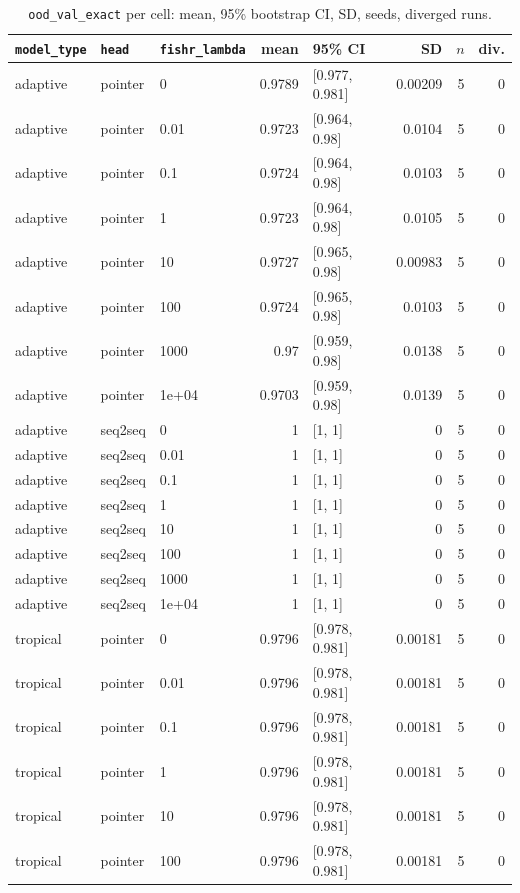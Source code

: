 \documentclass[10pt]{article}
\begin{document}
{\small
\begin{longtable}{lllrlrrr}
\caption{\texttt{ood\_val\_exact} per cell: mean, 95\% bootstrap CI, SD, seeds, diverged runs.}\label{tab:summary-ood_val_exact}\\
\toprule
\texttt{model\_type} & \texttt{head} & \texttt{fishr\_lambda} & mean & 95\% CI & SD & $n$ & div.\\
\midrule
\endhead
adaptive & pointer & 0 & 0.9789 & [0.977, 0.981] & 0.00209 & 5 & 0\\
adaptive & pointer & 0.01 & 0.9723 & [0.964, 0.98] & 0.0104 & 5 & 0\\
adaptive & pointer & 0.1 & 0.9724 & [0.964, 0.98] & 0.0103 & 5 & 0\\
adaptive & pointer & 1 & 0.9723 & [0.964, 0.98] & 0.0105 & 5 & 0\\
adaptive & pointer & 10 & 0.9727 & [0.965, 0.98] & 0.00983 & 5 & 0\\
adaptive & pointer & 100 & 0.9724 & [0.965, 0.98] & 0.0103 & 5 & 0\\
adaptive & pointer & 1000 & 0.97 & [0.959, 0.98] & 0.0138 & 5 & 0\\
adaptive & pointer & 1e+04 & 0.9703 & [0.959, 0.98] & 0.0139 & 5 & 0\\
adaptive & seq2seq & 0 & 1 & [1, 1] & 0 & 5 & 0\\
adaptive & seq2seq & 0.01 & 1 & [1, 1] & 0 & 5 & 0\\
adaptive & seq2seq & 0.1 & 1 & [1, 1] & 0 & 5 & 0\\
adaptive & seq2seq & 1 & 1 & [1, 1] & 0 & 5 & 0\\
adaptive & seq2seq & 10 & 1 & [1, 1] & 0 & 5 & 0\\
adaptive & seq2seq & 100 & 1 & [1, 1] & 0 & 5 & 0\\
adaptive & seq2seq & 1000 & 1 & [1, 1] & 0 & 5 & 0\\
adaptive & seq2seq & 1e+04 & 1 & [1, 1] & 0 & 5 & 0\\
tropical & pointer & 0 & 0.9796 & [0.978, 0.981] & 0.00181 & 5 & 0\\
tropical & pointer & 0.01 & 0.9796 & [0.978, 0.981] & 0.00181 & 5 & 0\\
tropical & pointer & 0.1 & 0.9796 & [0.978, 0.981] & 0.00181 & 5 & 0\\
tropical & pointer & 1 & 0.9796 & [0.978, 0.981] & 0.00181 & 5 & 0\\
tropical & pointer & 10 & 0.9796 & [0.978, 0.981] & 0.00181 & 5 & 0\\
tropical & pointer & 100 & 0.9796 & [0.978, 0.981] & 0.00181 & 5 & 0\\

\end{longtable}}
\end{document}
